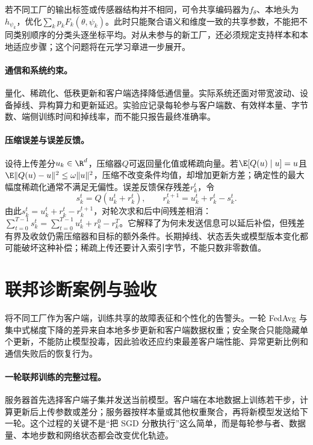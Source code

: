 若不同工厂的输出标签或传感器结构并不相同，可令共享编码器为$f_\theta$、本地头为$h_{\psi_k}$，优化$\sum_kp_kF_k(\theta,\psi_k)$。此时只能聚合语义和维度一致的共享参数，不能把不同类别顺序的分类头逐坐标平均。对从未参与的新工厂，还必须规定支持样本和本地适应步骤；这个问题将在元学习章进一步展开。

\paragraph{通信和系统约束。}
量化、稀疏化、低秩更新和客户端选择降低通信量。实际系统还面对带宽波动、设备掉线、异构算力和更新延迟。实验应记录每轮参与客户端数、有效样本量、字节数、端侧训练时间和掉线率，而不能只报告最终准确率。

\paragraph{压缩误差与误差反馈。}
设待上传差分$u_k\in\R^d$，压缩器$Q$可返回量化值或稀疏向量。若$\E[Q(u)\mid u]=u$且$\E\|Q(u)-u\|^2\leq\omega\|u\|^2$，压缩不改变条件均值，却增加更新方差；确定性的最大幅度稀疏化通常不满足无偏性。误差反馈保存残差$r_k^t$，令
\begin{equation}
 s_k^t=Q(u_k^t+r_k^t),\qquad
 r_k^{t+1}=u_k^t+r_k^t-s_k^t.
\end{equation}
由此$s_k^t=u_k^t+r_k^t-r_k^{t+1}$，对轮次求和后中间残差相消：$\sum_{t=0}^{T-1}s_k^t=\sum_{t=0}^{T-1}u_k^t+r_k^0-r_k^T$。它解释了为何未发送信息可以延后补偿，但残差有界及收敛仍需压缩器和目标的额外条件。长期掉线、状态丢失或模型版本变化都可能破坏这种补偿；稀疏上传还要计入索引字节，不能只数非零数值。

\section{联邦诊断案例与验收}
将不同工厂作为客户端，训练共享的故障表征和个性化的告警头。一轮 FedAvg 与集中式梯度下降的差异来自本地多步更新和客户端数据权重；安全聚合只能隐藏单个更新，不能防止模型投毒，因此验收还应约束最差客户端性能、异常更新比例和通信失败后的恢复行为。

\paragraph{一轮联邦训练的完整过程。}
服务器首先选择客户端子集并发送当前模型。客户端在本地数据上训练若干步，计算更新后上传参数或差分；服务器按样本量或其他权重聚合，再将新模型发送给下一轮。这个过程的关键不是“把 SGD 分散执行”这么简单，而是每轮参与者、数据量、本地步数和网络状态都会改变优化轨迹。

